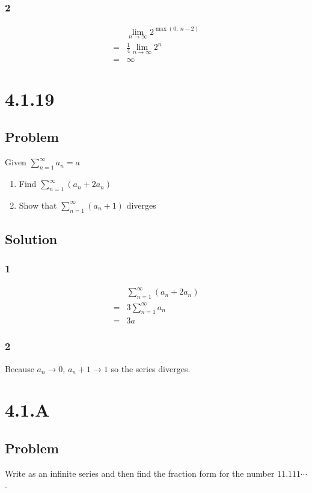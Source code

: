 \documentclass[12pt]{article}
\begin{document}
\subsubsection*{2}
\begin{align*}
     & \lim_{n\to\infty} 2^{\max(0,\ n-2)} \\
    =& \frac{1}{4} \lim_{n\to\infty} 2^n \\
    =& \infty
\end{align*}



\section*{4.1.19}

\subsection*{Problem}
Given $\sum_{n = 1}^\infty a_n = a$
\begin{enumerate}
    \item Find $\sum_{n = 1}^\infty (a_n + 2a_n)$
    \item Show that $\sum_{n = 1}^\infty (a_n + 1)$ diverges
\end{enumerate}

\subsection*{Solution}

\subsubsection*{1}
\begin{align*}
     & \sum_{n=1}^\infty (a_n + 2a_n) \\
    =& 3 \sum_{n=1}^\infty a_n \\
    =& 3a
\end{align*}

\subsubsection*{2}
Because $a_n \to 0$, $a_n + 1 \to 1$ so the series diverges.



\section*{4.1.A}

\subsection*{Problem}
Write as an infinite series and then find the fraction form for the number $11.111\cdots$.
\end{document}

